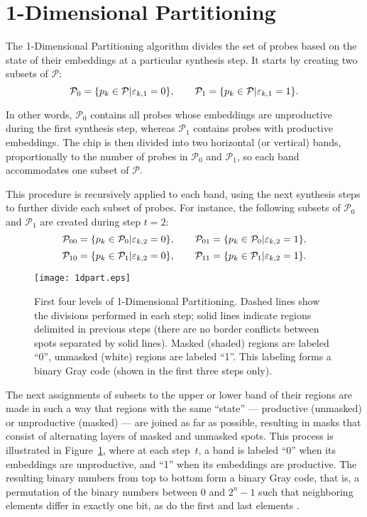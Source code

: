 \section{1-Dimensional Partitioning}
\label{sec:part_1d}

The 1-Dimensional Partitioning algorithm \citep{Carvalho2007} divides the set of
probes based on the state of their embeddings at a particular synthesis step. It
starts by creating two subsets of $\mathcal{P}$:
\[
\mathcal{P}_0 = \{ p_k \in \mathcal{P} | \varepsilon_{k,1} = 0 \},
\qquad
\mathcal{P}_1 = \{ p_k \in \mathcal{P} | \varepsilon_{k,1} = 1 \}.
\]

In other words, $\mathcal{P}_0$ contains all probes whose embeddings are
unproductive during the first synthesis step, whereas $\mathcal{P}_1$ contains
probes with productive embeddings. The chip is then divided into two horizontal
(or vertical) bands, proportionally to the number of probes in $\mathcal{P}_0$
and $\mathcal{P}_1$, so each band accommodates one subset of $\mathcal{P}$.

This procedure is recursively applied to each band, using the next synthesis
steps to further divide each subset of probes. For instance, the following
subsets of $\mathcal{P}_0$ and $\mathcal{P}_1$ are created during step $t=2$:
\[
\mathcal{P}_{00} = \{ p_k \in \mathcal{P}_0 | \varepsilon_{k,2} = 0 \},
\qquad
\mathcal{P}_{01} = \{ p_k \in \mathcal{P}_0 | \varepsilon_{k,2} = 1 \},
\]
\[
\mathcal{P}_{10} = \{ p_k \in \mathcal{P}_1 | \varepsilon_{k,2} = 0 \},
\qquad
\mathcal{P}_{11} = \{ p_k \in \mathcal{P}_1 | \varepsilon_{k,2} = 1 \}.
\]

\begin{figure}\centering
\texttt{[image: 1dpart.eps]}
\caption{\label{fig:1dpart}%
  First four levels of 1-Dimensional Partitioning. Dashed lines show the
  divisions performed in each step; solid lines indicate regions delimited in
  previous steps (there are no border conflicts between spots separated by
  solid lines). Masked (shaded) regions are labeled ``0'',
  unmasked (white) regions are labeled ``1''. This labeling forms
  a binary Gray code (shown in the first three steps only).}
\end{figure}

The next assignments of subsets to the upper or lower band of their regions are
made in such a way that regions with the same ``state'' --- productive
(unmasked) or unproductive (masked) --- are joined as far as possible, resulting
in masks that consist of alternating layers of masked and unmasked spots. This
process is illustrated in Figure~\ref{fig:1dpart}, where at each step~$t$, a
band is labeled ``0'' when its embeddings are unproductive, and ``1'' when its
embeddings are productive. The resulting binary numbers from top to bottom form
a binary Gray code, that is, a permutation of the binary numbers between 0 and
$2^n - 1$ such that neighboring elements differ in exactly one bit, as do the
first and last elements \citep{Kreher1999}.

